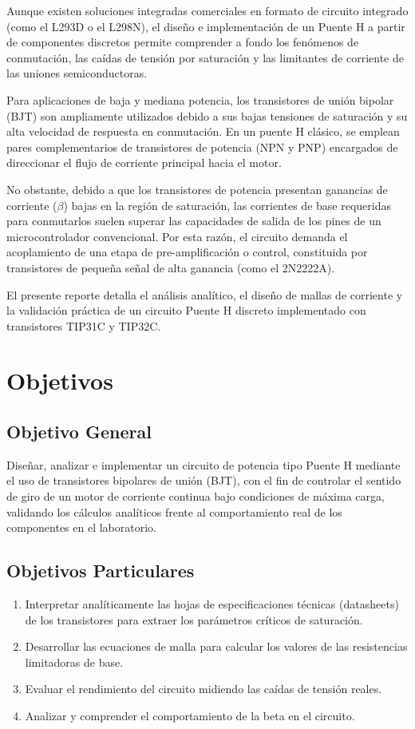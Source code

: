 \documentclass[journal]{IEEEtran}
\begin{document}
    Aunque existen soluciones integradas comerciales en formato de circuito integrado (como el L293D o el L298N), el diseño e implementación de un Puente H a partir de 
    componentes discretos permite comprender a fondo los fenómenos de conmutación, las caídas de tensión por saturación y las limitantes de corriente de las uniones 
    semiconductoras. 

    Para aplicaciones de baja y mediana potencia, los transistores de unión bipolar (BJT) son ampliamente utilizados debido a sus bajas tensiones de saturación y su alta velocidad de respuesta en conmutación. En un puente H clásico, se emplean pares complementarios de transistores de potencia (NPN y PNP) encargados de direccionar el flujo de corriente principal hacia el motor. 
    
    No obstante, debido a que los transistores de potencia presentan ganancias de corriente ($\beta$) bajas en la región de saturación, las corrientes de base requeridas para conmutarlos suelen superar las capacidades de salida de los pines de un microcontrolador convencional. 
    Por esta razón, el circuito demanda el acoplamiento de una etapa de pre-amplificación o control, constituida por transistores de pequeña señal de alta ganancia (como el 2N2222A). 
    
    El presente reporte detalla el análisis analítico, el diseño de mallas de corriente y la validación práctica de un circuito Puente H discreto implementado con transistores TIP31C y TIP32C.

    \section{Objetivos}
    \subsection{Objetivo General}
    Diseñar, analizar e implementar un circuito de potencia tipo Puente H mediante el uso de transistores bipolares de unión (BJT), con el fin de controlar el sentido de giro de un motor de corriente continua bajo condiciones de máxima carga, validando los cálculos analíticos frente al comportamiento real de los componentes en el laboratorio.

    \subsection{Objetivos Particulares}
    \begin{enumerate}
        \item Interpretar analíticamente las hojas de especificaciones técnicas (datasheets) de los transistores para extraer los parámetros críticos de saturación.
        \item Desarrollar las ecuaciones de malla para calcular los valores de las resistencias limitadoras de base.
        \item Evaluar el rendimiento del circuito midiendo las caídas de tensión reales.
        \item Analizar y comprender el comportamiento de la beta en el circuito.
    \end{enumerate}
\end{document}
